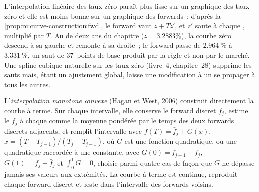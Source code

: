 L'interpolation linéaire des taux zéro paraît plus lisse sur un graphique des taux zéro et
elle est moins bonne sur un graphique des forwards~: d'après la \cref{prop:rc:curve-construction:fwd},
le forward vaut $z + Tz'$, et $z'$ saute à chaque , multiplié par $T$. Au
 de deux ans du chapitre ($z = 3.2883\%$), la courbe zéro descend à sa gauche
et remonte à sa droite~; le forward passe de $2.964~\%$ à $3.331~\%$, un
saut de 37~points de base produit par la règle et non par le marché. Une spline
cubique naturelle sur les taux zéro (livre~4, chapitre~28) supprime les
sauts mais, étant un ajustement global, laisse une modification à un  se
propager à tous les autres.

\begin{definition}\label{def:rc:curve-construction:monotone}
L'\emph{interpolation monotone convexe}
(Hagan et West, 2006) construit directement la courbe à terme. Sur chaque intervalle,
elle conserve le forward discret $\bar f_j$, estime le 
$f_j$ à chaque  comme la moyenne pondérée par le temps des deux forwards discrets
adjacents, et remplit l'intervalle avec $f(T)=\bar f_j + G(x)$,
$x=(T-T_{j-1})/(T_j-T_{j-1})$, où $G$ est une fonction quadratique, ou une quadratique
raccordée à une constante, avec $G(0)=f_{j-1}-\bar f_j$, $G(1)=f_j-\bar f_j$ et
$\int_0^1G=0$, choisie parmi quatre cas de façon que $G$ ne dépasse jamais ses valeurs
aux extrémités. La courbe à terme est continue, reproduit chaque forward discret
et reste dans l'intervalle des forwards voisins.
\end{definition}

\label{lst:rc:curve-construction:mc}

